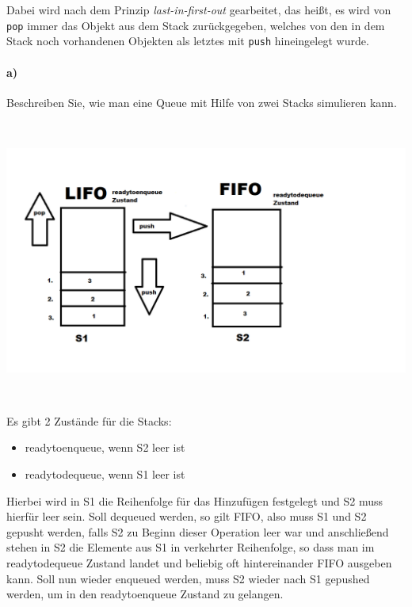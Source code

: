 \documentclass[paper=a4, fontsize=11pt]{scrartcl}
\numberwithin{equation}{section}
\numberwithin{figure}{section}
\numberwithin{table}{section}
\begin{document}
\noindent Dabei wird nach dem Prinzip \emph{last-in-first-out} gearbeitet, das heißt, es wird von \texttt{pop} immer das Objekt aus dem Stack zurückgegeben, welches von den in dem Stack noch vorhandenen Objekten als letztes mit \texttt{push} hineingelegt wurde. 

\paragraph{a)} 
Beschreiben Sie, wie man eine Queue mit Hilfe von zwei Stacks simulieren kann. \\

\includegraphics[width=15cm,height=10cm]{QueueStack.png} \\

Es gibt 2 Zustände für die Stacks: 
\begin{itemize}
\item readytoenqueue, wenn S2 leer ist
\item readytodequeue, wenn S1 leer ist
\end{itemize}

Hierbei wird in S1 die Reihenfolge für das Hinzufügen festgelegt und S2 muss hierfür leer sein. Soll dequeued werden, so gilt FIFO, also muss S1 und S2 gepusht werden, falls S2 zu Beginn dieser Operation leer war und anschließend stehen in S2 die Elemente aus S1 in verkehrter Reihenfolge, so dass man im readytodequeue Zustand landet und beliebig oft hintereinander FIFO ausgeben kann. Soll nun wieder enqueued werden, muss S2 wieder nach S1 gepushed werden, um in den readytoenqueue Zustand zu gelangen. \\
\end{document}
